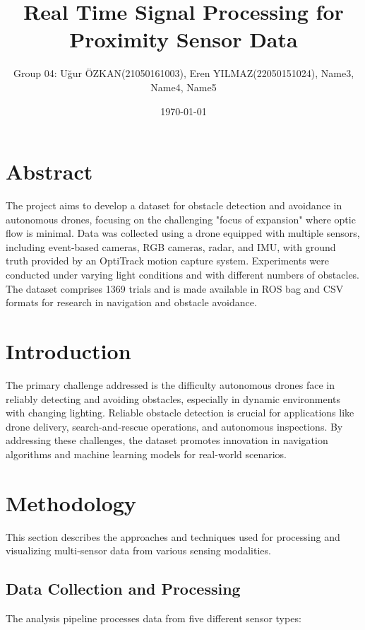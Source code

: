 \documentclass[12pt,a4paper]{article}
\title{Real Time Signal Processing for Proximity Sensor Data}
\author{Group 04: Uğur ÖZKAN(21050161003), Eren YILMAZ(22050151024), Name3, Name4, Name5}
\date{\today}
\begin{document}
\maketitle
\section{Abstract}

The project aims to develop a dataset for obstacle detection and avoidance in autonomous drones, focusing on the challenging "focus of expansion" where optic flow is minimal. Data was collected using a drone equipped with multiple sensors, including event-based cameras, RGB cameras, radar, and IMU, with ground truth provided by an OptiTrack motion capture system. Experiments were conducted under varying light conditions and with different numbers of obstacles. The dataset comprises 1369 trials and is made available in ROS bag and CSV formats for research in navigation and obstacle avoidance.

\section{Introduction}

The primary challenge addressed is the difficulty autonomous drones face in reliably detecting and avoiding obstacles, especially in dynamic environments with changing lighting. Reliable obstacle detection is crucial for applications like drone delivery, search-and-rescue operations, and autonomous inspections. By addressing these challenges, the dataset promotes innovation in navigation algorithms and machine learning models for real-world scenarios.

\section{Methodology}

This section describes the approaches and techniques used for processing and visualizing multi-sensor data from various sensing modalities.

\subsection{Data Collection and Processing}

The analysis pipeline processes data from five different sensor types:
\end{document}
